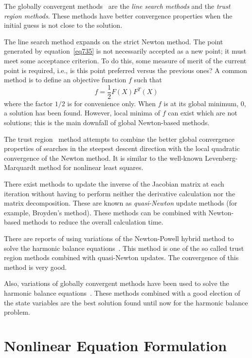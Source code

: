 The globally convergent methods~\cite{NNES} are the {\em line
search methods} and the {\em trust region methods}. These methods have
better convergence properties when the initial guess is not close to
the solution.

The line search method expands on the strict Newton method. The point
generated by equation~\ref{eq735} is not necessarily accepted as a new
point; it must meet some acceptance criterion. To do this, some
measure of merit of the current point is required, i.e., is this point
preferred versus the previous ones? A common method is to define an
objective function $f$ such that
\begin{equation}
  f = \frac{1}{2}F(X)F^T(X) \label{eqnnes12}
\end{equation}
where the factor $1/2$ is for convenience only. When $f$ is at its
global minimum, 0, a solution has been found. However, local minima of
$f$ can exist which are not solutions; this is the main downfall of
global Newton-based methods.

The trust region~\cite{powell:1988} method attempts to combine the
better global convergence properties of searches in the steepest
descent direction with the local quadratic convergence of the Newton
method. It is similar to the well-known Levenberg-Marquardt method for
nonlinear least squares.

There exist methods to update the inverse of the Jacobian matrix at
each iteration without having to perform neither the derivative
calculation nor the matrix decomposition. These are known as {\em
quasi-Newton} update methods (for example, Broyden's method). These
methods can be combined with Newton-based methods to reduce the
overall calculation time.


There are reports of using variations of the Newton-Powell hybrid
method to solve the harmonic balance equations~\cite{damore:94}. This
method is one of the so called trust region methods combined with
quasi-Newton updates.  The convergence of this method is very good.

Also, variations of globally convergent methods have been used to
solve the harmonic balance equations~\cite{rizzoli:92:1}. These
methods combined with a good election of the state variables are the
best solution found until now for the harmonic balance problem.


\section{Nonlinear Equation Formulation}

